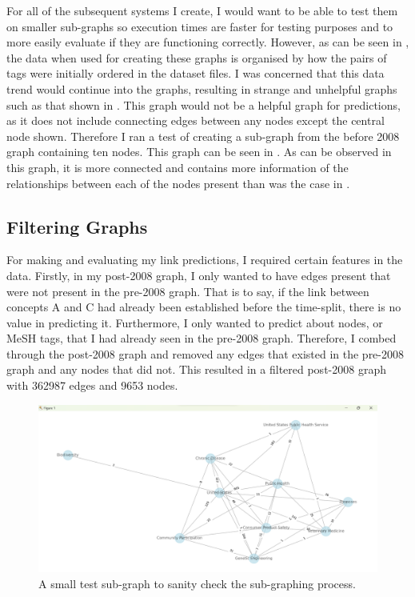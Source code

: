 \documentclass{l4proj}
\begin{document}
For all of the subsequent systems I create, I would want to be able to test them on smaller sub-graphs so execution times are faster for testing purposes and to more easily evaluate if they are functioning correctly. However, as can be seen in , the data when used for creating these graphs is organised by how the pairs of tags were initially ordered in the dataset files. I was concerned that this data trend would continue into the graphs, resulting in strange and unhelpful graphs such as that shown in . This graph would not be a helpful graph for predictions, as it does not include connecting edges between any nodes except the central node shown. Therefore I ran a test of creating a sub-graph from the before 2008 graph containing ten nodes. This graph can be seen in . As can be observed in this graph, it is more connected and contains more information of the relationships between each of the nodes present than was the case in . \\

\subsection{Filtering Graphs}

For making and evaluating my link predictions, I required certain features in the data. Firstly, in my post-2008 graph, I only wanted to have edges present that were not present in the pre-2008 graph. That is to say, if the link between concepts A and C had already been established before the time-split, there is no value in predicting it. Furthermore, I only wanted to predict about nodes, or MeSH tags, that I had already seen in the pre-2008 graph. Therefore, I combed through the post-2008 graph and removed any edges that existed in the pre-2008 graph and any nodes that did not. This resulted in a filtered post-2008 graph with 362987 edges and 9653 nodes. \\

\begin{figure}[h]
    \centering
    \includegraphics[width=\linewidth]{images/test_subgraph.png}
    \caption{A small test sub-graph to sanity check the sub-graphing process.}
    \label{fig:test_subgraph}
\end{figure}
\end{document}
